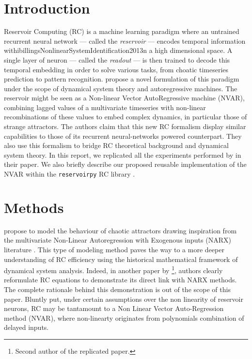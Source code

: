 
\section{Introduction}

Reservoir Computing (RC) is a machine learning paradigm where
an untrained recurrent neural network --- called the \textit{reservoir} --- encodes
temporal information withibillingsNonlinearSystemIdentification2013n a high dimensional space.
A single layer of neuron --- called the \textit{readout} ---
is then trained to decode this temporal embedding in order
to solve various tasks, from choatic timeseries prediction to pattern recognition.
\citet{gauthier2021next} propose a novel formulation of this paradigm under
the scope of dynamical system theory and autoregressive machines.
The reservoir might be seen as a Non-linear Vector AutoRegressive machine (NVAR),
combining lagged values of a multivariate timeseries
with non-linear recombinations of these values to embed complex dynamics,
in particular those of strange attractors.
The authors claim that this new RC formalism display similar capabilities to those
of its recurrent neural-networks powered counterpart. They also use this formalism
to bridge RC theoretical background and dynamical system theory\foot.
In this report, we replicated all the experiments performed by \citet{gauthier2021next}
in their paper. We also briefly describe our proposed reusable implementation
of the NVAR within the \texttt{reservoirpy} RC library \supercite{trouvain2020}.

\section{Methods}

\citet{gauthier2021next} propose to model the behaviour of chaotic attractors drawing inspiration
from the multivariate Non-Linear Autoregression with Exogenous inputs (NARX) literature \cite{billings2013}.
This type of modeling method paves the way to a more deeper understanding of RC efficiency using
the historical mathematical framework of dynamical system analysis. Indeed, in another paper by \citet{bollt2021}
\footnote{Second author of the replicated paper.}, authors clearly reformulate RC equations to demonstrate
its direct link with NARX methods. The complete rationale behind this demonstration is out of the scope
of this paper. Bluntly put, under certain assumptions over the non linearity of reservoir neurons,
RC may be tantamount to a Non Linear Vector Auto-Regression method (NVAR), where non-linearty originates
from polynomials combination of delayed inputs.

